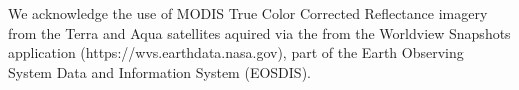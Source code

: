\documentclass[aog]{igs}
\begin{document}


We acknowledge the use of MODIS True Color Corrected Reflectance imagery from the Terra and Aqua satellites aquired via the from the Worldview Snapshots application (https://wvs.earthdata.nasa.gov), part of the Earth Observing System Data and Information System (EOSDIS). 



\end{document}
